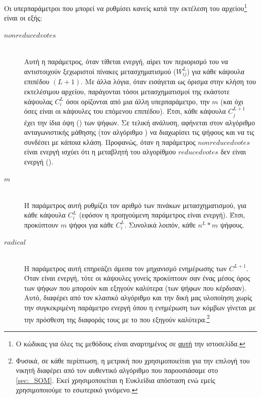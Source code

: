 Οι υπερπαράμετροι που μπορεί να ρυθμίσει κανείς κατά την εκτέλεση του αρχείου\footnote{Ο κώδικας για όλες τις μεθόδους είναι αναρτημένος σε \href{https://github.com/abarmper/Capsule_Nets_with_uncertainty}{αυτή} την ιστοσελίδα.} είναι οι εξής:


\begin{description}
  \item[$non reduced votes$] \hfill \\ Αυτή η παράμετρος, όταν τίθεται ενεργή, αίρει τον περιορισμό του να αντιστοιχούν ξεχωριστοί πίνακες μετασχηματισμού ($W_{ij}^L$) για κάθε κάψουλα επιπέδου $(L+1)$. Με άλλα λόγια, όταν εισάγεται ως όρισμα στην κλήση του εκτελέσιμου αρχείου, παράγονται τόσοι μετασχηματισμοί της εκάστοτε κάψουλας $C_i^L$ όσοι ορίζονται από μια άλλη υπερπαράμετρο, την $m$ (και όχι όσες είναι οι κάψουλες του επόμενου επιπέδου). Έτσι, κάθε κάψουλα $C^{L+1}_j$ έχει την ίδια όψη () των ψήφων. Σε τελική ανάλυση, αφήνεται στον αλγόριθμο ανταγωνιστικής μάθησης (τον αλγόριθμο ) να διαχωρίσει τις ψήφους και να τις συνδέσει με κάποια κλάση. Προφανώς, όταν η παράμετρος $non reduced votes$ είναι ενεργή ισχύει ότι η μεταβλητή του αλγορίθμου $reduced votes$ δεν είναι ενεργή ().
  
  \item[$m$] \hfill \\ Η παράμετρος αυτή ρυθμίζει τον αριθμό των πινάκων μετασχηματισμού, για κάθε κάψουλα $C_i^L$ (εφόσον η προηγούμενη παράμετρος είναι ενεργή). Έτσι, προκύπτουν $m$ ψήφοι για κάθε $C_i^L$. Συνολικά λοιπόν, κάθε   $n^L \ast m$ ψήφους.
  
  \item[$radical$] \hfill \\ Η παράμετρος αυτή επηρεάζει άμεσα τον μηχανισμό ενημέρωσης των $C^{L+1}$. Όταν είναι ενεργή, τότε οι κάψουλες γονείς προκύπτουν σαν ένας μέσος όρος των ψήφων που μπορούν και εξηγούν καλύτερα (των ψήφων που κέρδισαν). Αυτό, διαφέρει από τον κλασικό αλγόριθμο  και την δική μας υλοποίηση χωρίς την συγκεκριμένη παράμετρο ενεργή όπου η ενημέρωση των κόμβων γίνεται με την πρόσθεση της διαφοράς τους με το  που εξηγούν καλύτερα.\footnote{Φυσικά, σε κάθε περίπτωση, η μετρική που χρησιμοποιείται για την επιλογή του νικητή διαφέρει από τον αυθεντικό αλγόριθμο που παρουσιάσαμε στο \ref{sec:_SOM}. Εκεί χρησιμοποιείται η Ευκλείδια απόσταση ενώ εμείς χρησιμοποιούμε το εσωτερικό γινόμενο.}
  

\end{description}
